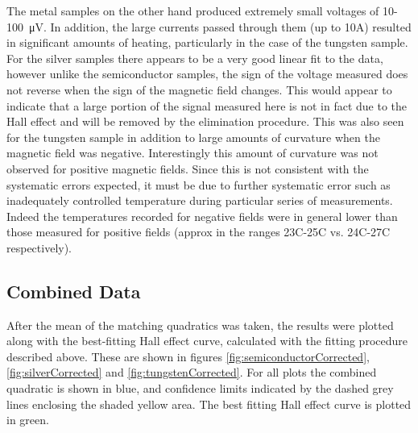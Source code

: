 \documentclass[a4paper]{article}
\begin{document}
			The metal samples on the other hand produced extremely small voltages of 10-100\SI{}{\micro\volt}. In addition, the large currents passed through them (up to 10A) resulted in significant amounts of heating, particularly in the case of the tungsten sample. For the silver samples there appears to be a very good linear fit to the data, however unlike the semiconductor samples, the sign of the voltage measured does not reverse when the sign of the magnetic field changes. This would appear to indicate that a large portion of the signal measured here is not in fact due to the Hall effect and will be removed by the elimination procedure. This was also seen for the tungsten sample in addition to large amounts of curvature when the magnetic field was negative. Interestingly this amount of curvature was not observed for positive magnetic fields. Since this is not consistent with the systematic errors expected, it must be due to further systematic error such as inadequately controlled temperature during particular series of measurements. Indeed the temperatures recorded for negative fields were in general lower than those measured for positive fields (approx in the ranges 23\degree C-25\degree C vs. 24\degree C-27\degree C respectively).
		
		\subsection{Combined Data}
			After the mean of the matching quadratics was taken, the results were plotted along with the best-fitting Hall effect curve, calculated with the fitting procedure described above. These are shown in figures \ref{fig:semiconductorCorrected}, \ref{fig:silverCorrected} and \ref{fig:tungstenCorrected}. For all plots the combined quadratic is shown in blue, and confidence limits indicated by the dashed grey lines enclosing the shaded yellow area. The best fitting Hall effect curve is plotted in green.
			
\end{document}
